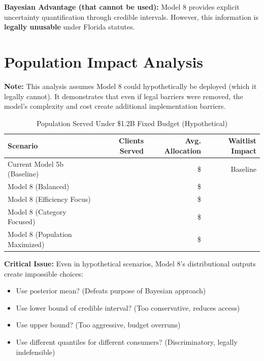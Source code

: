 \textbf{Bayesian Advantage (that cannot be used):} Model 8 provides explicit uncertainty quantification through credible intervals. However, this information is \textbf{legally unusable} under Florida statutes.


\section{Population Impact Analysis}

\textbf{Note:} This analysis assumes Model 8 could hypothetically be deployed (which it legally cannot). It demonstrates that even if legal barriers were removed, the model's complexity and cost create additional implementation barriers.

\begin{table}[h]
\centering
\caption{Population Served Under \$1.2B Fixed Budget (Hypothetical)}
\begin{tabular}{lrrr}
\toprule
\textbf{Scenario} & \textbf{Clients Served} & \textbf{Avg. Allocation} & \textbf{Waitlist Impact} \\
\midrule
Current Model 5b (Baseline) & \ModelEightPopcurrentbaselineClients{} & \$\ModelEightPopcurrentbaselineAvgAlloc{} & Baseline \\
Model 8 (Balanced) & \ModelEightPopmodelbalancedClients{} & \$\ModelEightPopmodelbalancedAvgAlloc{} & \ModelEightPopmodelbalancedWaitlistChange{} \\
Model 8 (Efficiency Focus) & \ModelEightPopmodelefficiencyClients{} & \$\ModelEightPopmodelefficiencyAvgAlloc{} & \ModelEightPopmodelefficiencyWaitlistChange{} \\
Model 8 (Category Focused) & \ModelEightPopcategoryfocusedClients{} & \$\ModelEightPopcategoryfocusedAvgAlloc{} & \ModelEightPopcategoryfocusedWaitlistChange{} \\
Model 8 (Population Maximized) & \ModelEightPoppopulationmaximizedClients{} & \$\ModelEightPoppopulationmaximizedAvgAlloc{} & \ModelEightPoppopulationmaximizedWaitlistChange{} \\
\bottomrule
\end{tabular}
\end{table}

\textbf{Critical Issue:} Even in hypothetical scenarios, Model 8's distributional outputs create impossible choices:
\begin{itemize}
    \item Use posterior mean? (Defeats purpose of Bayesian approach)
    \item Use lower bound of credible interval? (Too conservative, reduces access)
    \item Use upper bound? (Too aggressive, budget overruns)
    \item Use different quantiles for different consumers? (Discriminatory, legally indefensible)
\end{itemize}


